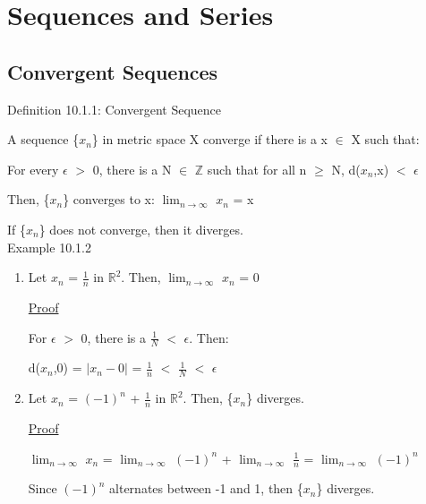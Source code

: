 \newpage

\section[Day 10: Sequences and Series]{Sequences and Series}

\subsection{Convergent Sequences}

{ \color{blue} Definition 10.1.1: Convergent Sequence } 

    \begin{adjustbox}{minipage=14cm, right, vspace=0.1cm 0cm}
        A sequence \{$x_n$\} in metric space X converge if
        there is a x $\in$ X such that:

        \hspace{1cm}
        For every $\epsilon$ $>$ 0, there is a N $\in$ $\mathbb{Z}$ such that
        for all n $\geq$ N, d($x_n$,x) $<$ $\epsilon$
        
        Then, \{$x_n$\} converges to x: \hspace{1cm}
        $\lim_{n \rightarrow \infty}$ $x_n$ = x

        If \{$x_n$\} does not converge, then it diverges. \\
	\end{adjustbox}

{ \color{purple} Example 10.1.2 }

    \begin{enumerate}[label=(\alph*), leftmargin=2cm, itemsep=0.4em]
        \item Let $x_n$ = $\frac{1}{n}$ in $\mathbb{R}^2$.
        Then, $\lim_{n \rightarrow \infty}$ $x_n$ = 0

            { \color{magenta} \underline{Proof} }

                For $\epsilon$ $>$ 0, there is a $\frac{1}{N}$ $<$ $\epsilon$.
                Then:

                \hspace{1cm}
                d($x_n$,0) = $|x_n - 0|$ = $\frac{1}{n}$
                $<$ $\frac{1}{N}$ $<$ $\epsilon$

        \item Let $x_n$ = $(-1)^n$ + $\frac{1}{n}$ in $\mathbb{R}^2$.
        Then, \{$x_n$\} diverges.

            { \color{magenta} \underline{Proof} }

                $\lim_{n \rightarrow \infty}$ $x_n$
                = $\lim_{n \rightarrow \infty}$ $(-1)^n$
                + $\lim_{n \rightarrow \infty}$ $\frac{1}{n}$
                = $\lim_{n \rightarrow \infty}$ $(-1)^n$

                Since $(-1)^n$ alternates between -1 and 1, then
                \{$x_n$\} diverges. \\
    \end{enumerate}


